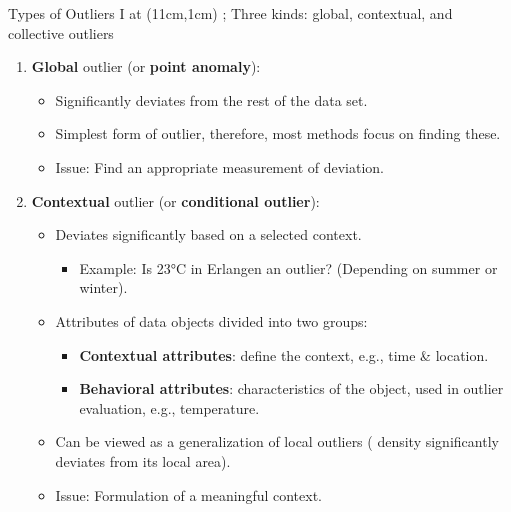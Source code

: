 \begin{frame}{Types of Outliers I}
	\tikzoverlay at (11cm,1cm) {};
	Three kinds: global, contextual, and collective outliers
	\begin{enumerate}
		\item \textbf{Global} outlier (or \textbf{\color{faugray}point anomaly}):
		      \begin{itemize}
			      \item Significantly deviates from the rest of the data set.
			      \item Simplest form of outlier, therefore, most methods focus on finding these.
			      \item Issue: Find an appropriate measurement of deviation.
		      \end{itemize}
		\item \textbf{Contextual} outlier (or \textbf{\color{faugray}conditional outlier}):
		      \begin{itemize}
			      \item Deviates significantly based on a selected context.
			            \begin{itemize}
				            \item Example: Is 23°C in Erlangen an outlier? (Depending on summer or winter).
			            \end{itemize}
			      \item Attributes of data objects divided into two groups:
			            \begin{itemize}
				            \item \textbf{Contextual attributes}: define the context, e.g., time \& location.
				            \item \textbf{Behavioral attributes}: characteristics of the object, used in outlier evaluation, e.g., temperature.
			            \end{itemize}
			      \item Can be viewed as a generalization of local outliers ({\color{faugray} density significantly deviates from its local area}).
			      \item Issue: Formulation of a meaningful context.
		      \end{itemize}
	\end{enumerate}
\end{frame}



